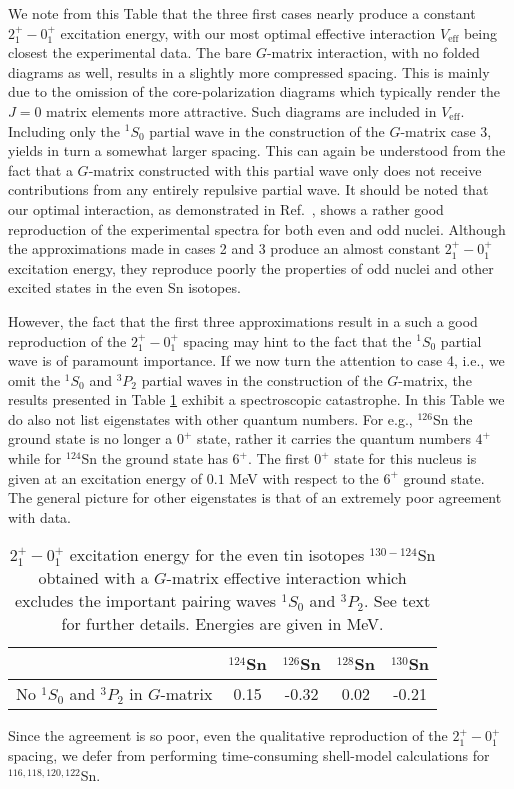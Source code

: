 We note from this Table that the three first cases nearly produce a constant 
$2^+_1-0^+_1$ excitation energy, with our most optimal effective interaction
$V_{\mathrm{eff}}$ being closest the experimental data. The bare $G$-matrix
interaction, with no folded diagrams as well, results in a slightly more compressed
spacing. This is mainly due to the omission of the core-polarization 
diagrams which typically render the $J=0$ matrix elements more attractive.
Such diagrams are included in $V_{\mathrm{eff}}$. 
Including only the $^1S_0$ partial wave in the construction of the  $G$-matrix
case 3,
yields in turn a somewhat larger spacing. This can again be understood from the
fact that a $G$-matrix constructed with this partial wave  
only does not receive contributions from any entirely repulsive partial wave.
It should be noted that our optimal interaction, as demonstrated in Ref.\ \cite{ehho97}, shows a rather good reproduction of the 
experimental spectra for both even and odd nuclei. Although the approximations
made in cases 2 and 3 produce an almost constant $2^+_1-0^+_1$ excitation energy,
they reproduce poorly the properties of odd nuclei and other 
excited states in the even Sn isotopes. 

However, the fact that the first three  approximations result in a such a good
reproduction of the  $2^+_1-0^+_1$ spacing may hint to the fact that the 
$^1S_0$ partial wave is of paramount importance. 
If we now turn the attention to case 4, i.e., we omit the
$^1S_0$ and $^3P_2$ partial waves in the construction of the $G$-matrix,
the results presented  in Table \ref{tab:table2} exhibit  a spectroscopic 
catastrophe. In this Table we do also not list eigenstates
with other quantum numbers. For e.g., $^{126}$Sn
the ground state is no longer a $0^+$ state, rather it carries the quantum numbers
$4^+$ while for $^{124}$Sn the ground state 
has $6^+$. The first $0^+$ state for this nucleus is given at an excitation
energy of $0.1$ MeV with respect to the $6^+$ ground state.
The general picture for other eigenstates is that of an extremely poor agreement
with data.  
\begin{table}[t]
\begin{center}
\caption{ $2^+_1-0^+_1$ excitation energy for the 
even tin isotopes $^{130-124}$Sn obtained with a $G$-matrix
effective interaction which excludes the important
pairing waves $^1S_0$ and $^3P_2$. See text for further details. 
Energies are given in MeV. \label{tab:table2}}
\begin{tabular}{lcccc}\hline
& {$^{124}$Sn} & {$^{126}$Sn} & {$^{128}$Sn} & {$^{130}$Sn} \\ \hline
No $^1S_0$ and $^3P_2$ in $G$-matrix &0.15  &-0.32  &0.02 &-0.21  \\\hline
\end{tabular}
\end{center}
\end{table}
Since the agreement is so poor, even the qualitative reproduction of the 
$2^+_1-0^+_1$ spacing, we defer from performing time-consuming shell-model
calculations for $^{116,118,120,122}$Sn.

